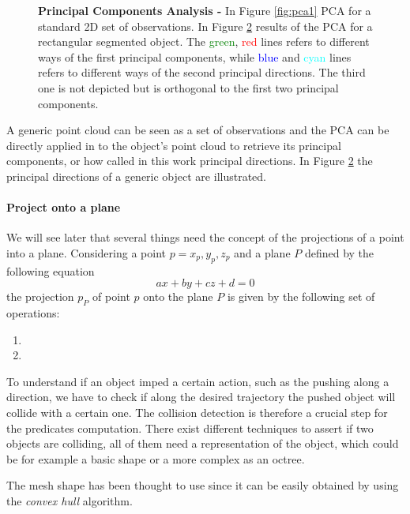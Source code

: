 \begin{figure}[h]
\begin{subfigure}[t]{0.45\textwidth}
\caption{}\label{fig:pca2}
\end{subfigure}
\caption{\textbf{Principal Components Analysis -} In Figure \ref{fig:pca1} PCA for a standard 2D set of observations. In Figure \ref{fig:pca2} results of the PCA for a rectangular segmented object. The \textcolor{green}{green}, \textcolor{red}{red} lines refers to different ways of the first principal components, while \textcolor{blue}{blue} and \textcolor{cyan}{cyan} lines refers to different ways of the second principal directions. The third one is not depicted but is orthogonal to the first two principal components.}
\end{figure}

A generic point cloud can be seen as a set of observations and the PCA can be directly applied in to the object's point cloud to retrieve its principal components, or how called in this work principal directions. In Figure \ref{fig:pca2} the principal directions of a generic object are illustrated. 

\paragraph{Project onto a plane}
We will see later that several things need the concept of the projections of a point into a plane. Considering a point $p={x_p,y_p,z_p}$ and a plane $P$ defined by the following equation
\begin{equation}
a x + by + cz + d = 0
\end{equation}
the projection $p_P$ of point $p$ onto the plane $P$ is given by the following set of operations:
\begin{enumerate}
\item
\item
\end{enumerate}



To understand if an object imped a certain action, such as the pushing along a direction, we have to check if along the desired trajectory the pushed object will collide with a certain one. The collision detection is therefore a crucial step for the predicates computation. There exist different techniques to assert if two objects are colliding, all of them need a representation of the object, which could be for example a basic shape or a more complex as an octree. 

The mesh shape has been thought to use since it can be easily obtained by using the \textit{convex hull} algorithm. 

